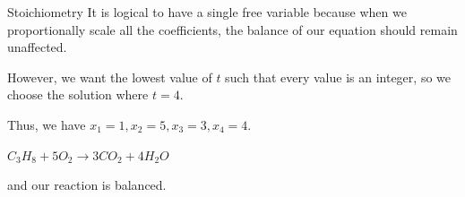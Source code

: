 \documentclass{beamer}
\begin{document}
\begin{frame}{Stoichiometry}
It is logical to have a single free variable because when we proportionally scale all the coefficients, the balance of our equation should remain unaffected.

However, we want the lowest value of $t$ such that every value is an integer, so we choose the solution where $t=4$.

Thus, we have \(x_1 = 1, x_2=5, x_3=3, x_4=4\).

\begin{center}
    \(C_3H_8 + 5O_2 \xrightarrow{} 3CO_2 + 4H_2O\)
\end{center}

and our reaction is balanced.

\end{frame}
\end{document}
